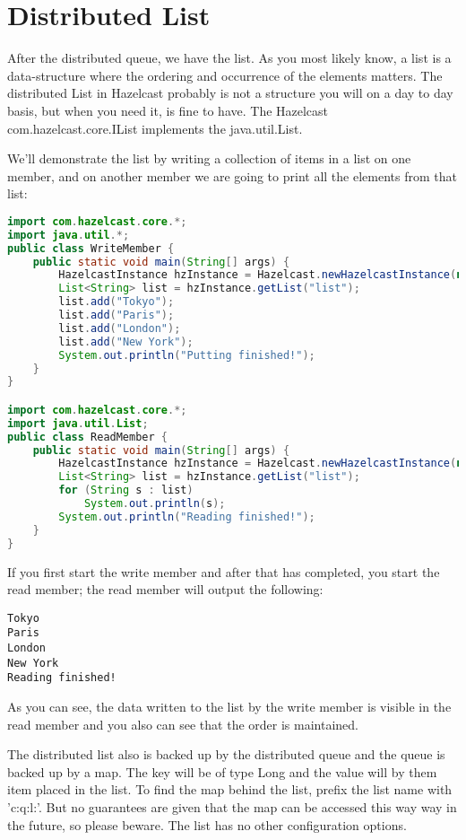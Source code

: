 \section{Distributed List}
After the distributed queue, we have the list. As you most likely know, a list is a data-structure where the ordering and occurrence of the elements matters. The distributed List in Hazelcast probably is not a structure you will on a day to day basis, but when you need it, is fine to have. The Hazelcast com.hazelcast.core.IList implements the java.util.List.

We'll demonstrate the list by writing a collection of items in a list on one member, and on another member we are going to print all the elements from that list:
\begin{lstlisting}[language=java]
import com.hazelcast.core.*;
import java.util.*;
public class WriteMember {
    public static void main(String[] args) {
        HazelcastInstance hzInstance = Hazelcast.newHazelcastInstance(null);
        List<String> list = hzInstance.getList("list");
        list.add("Tokyo");
        list.add("Paris");
        list.add("London");
        list.add("New York");
        System.out.println("Putting finished!");
    }
}

import com.hazelcast.core.*;
import java.util.List;
public class ReadMember {
    public static void main(String[] args) {
        HazelcastInstance hzInstance = Hazelcast.newHazelcastInstance(null);
        List<String> list = hzInstance.getList("list");
        for (String s : list) 
            System.out.println(s);
        System.out.println("Reading finished!");
    }
}
\end{lstlisting}
If you first start the write member and after that has completed, you start the read member; the read member will output the following:
\begin{lstlisting}
Tokyo
Paris
London
New York
Reading finished!
\end{lstlisting}
As you can see, the data written to the list by the write member is visible in the read member and you also can see that the order is maintained.

The distributed list also is backed up by the distributed queue and the queue is backed up by a map. The key will be of type Long and the value will by them item placed in the list. To find the map behind the list, prefix the list name with 'c:q:l:'. But no guarantees are given that the map can be accessed this way way in the future, so please beware. The list has no other configuration options.

